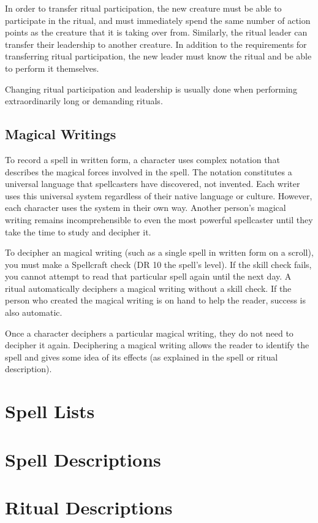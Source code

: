             In order to transfer ritual participation, the new creature must be able to participate in the ritual, and must immediately spend the same number of action points as the creature that it is taking over from.
            Similarly, the ritual leader can transfer their leadership to another creature.
            In addition to the requirements for transferring ritual participation, the new leader must know the ritual and be able to perform it themselves.

            Changing ritual participation and leadership is usually done when performing extraordinarily long or demanding rituals.

    \subsection{Magical Writings}
        To record a spell in written form, a character uses complex notation that describes the magical forces involved in the spell.
        The notation constitutes a universal language that spellcasters have discovered, not invented.
        Each writer uses this universal system regardless of their native language or culture.
        However, each character uses the system in their own way.
        Another person's magical writing remains incomprehensible to even the most powerful spellcaster until they take the time to study and decipher it.

        To decipher an magical writing (such as a single spell in written form on a scroll), you must make a Spellcraft check (DR 10 \add the spell's level). If the skill check fails, you cannot attempt to read that particular spell again until the next day.
        A  ritual automatically deciphers a magical writing without a skill check.
        If the person who created the magical writing is on hand to help the reader, success is also automatic.

        Once a character deciphers a particular magical writing, they do not need to decipher it again.
        Deciphering a magical writing allows the reader to identify the spell and gives some idea of its effects (as explained in the spell or ritual description).
        

\section{Spell Lists}



\section{Spell Descriptions}



\section{Ritual Descriptions}


